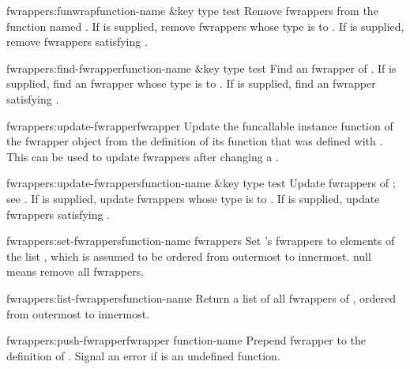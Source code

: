 \begin{defun}{fwrappers:}{funwrap}{function-name \&key type test}
  Remove fwrappers from the function named .  If
   is supplied, remove fwrappers whose type is 
  to .  If  is supplied, remove fwrappers
  satisfying .
\end{defun}

\begin{defun}{fwrappers:}{find-fwrapper}{function-name \&key type test}
  Find an fwrapper of .  If  is supplied,
  find an fwrapper whose type is  to .  If
   is supplied, find an fwrapper satisfying .
\end{defun}

\begin{defun}{fwrappers:}{update-fwrapper}{fwrapper}
  Update the funcallable instance function of the fwrapper object
   from the definition of its function that was 
  defined with .  This can be used to update
  fwrappers after changing a .
\end{defun}

\begin{defun}{fwrappers:}{update-fwrappers}{function-name \&key type test}
  Update fwrappers of ; see .
  If  is supplied, update fwrappers whose type is
   to .  If  is supplied, update fwrappers
  satisfying .
\end{defun}

\begin{defun}{fwrappers:}{set-fwrappers}{function-name fwrappers}
  Set 's fwrappers to elements of the list
  , which is assumed to be ordered from outermost to
  innermost.   null means remove all fwrappers.
\end{defun}

\begin{defun}{fwrappers:}{list-fwrappers}{function-name}
  Return a list of all fwrappers of , ordered
  from outermost to innermost.
\end{defun}

\begin{defun}{fwrappers:}{push-fwrapper}{fwrapper function-name}
  Prepend fwrapper  to the definition of
  .  Signal an error if  is an
  undefined function.
\end{defun}

